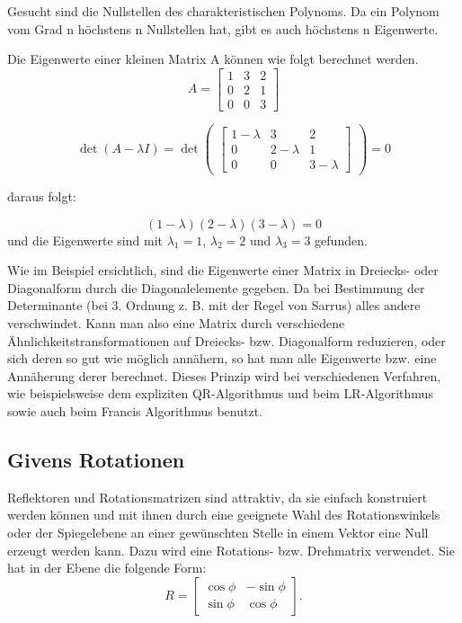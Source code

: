 Gesucht sind die Nullstellen des charakteristischen Polynoms. Da ein Polynom vom Grad n höchstens n Nullstellen hat, gibt es auch höchstens n Eigenwerte.

\begin{beispiel}
	Die Eigenwerte einer kleinen Matrix A können wie folgt berechnet werden.
	\begin{equation}
	A =
	\begin{bmatrix}
	1 & 3 & 2 \\
	0 & 2 & 1 \\
	0 & 0 & 3
	\end{bmatrix}
	\end{equation}
	
	\begin{equation}
	\det(A-\lambda I)= \det
	\begin{pmatrix}
	\begin{bmatrix}
	1-\lambda & 3 & 2 \\
	0 & 2-\lambda & 1 \\
	0 & 0 & 3-\lambda
	\end{bmatrix}
	\end{pmatrix}
	= 0
	\end{equation}
	
	daraus folgt:
	
	\begin{equation} (1-\lambda)(2-\lambda)(3-\lambda)=0\end{equation}
	und die Eigenwerte sind mit $\lambda_{1}=1$, $\lambda_{2}=2$ und $\lambda_{3}=3$ gefunden.
\end{beispiel}

Wie im Beispiel ersichtlich, sind die Eigenwerte einer Matrix in Dreiecks- oder Diagonalform durch die Diagonalelemente gegeben.
Da bei Bestimmung der Determinante (bei 3. Ordnung z. B. mit der Regel von Sarrus) alles andere verschwindet.
Kann man also eine Matrix durch verschiedene Ähnlichkeitstransformationen auf Dreiecks- bzw. Diagonalform reduzieren, oder sich deren so gut wie möglich annähern, so hat man alle Eigenwerte bzw. eine Annäherung derer berechnet.
Dieses Prinzip wird bei verschiedenen Verfahren, wie beispielsweise dem expliziten QR-Algorithmus und beim LR-Algorithmus sowie auch beim Francis Algorithmus benutzt.

\subsection{Givens Rotationen\label{francis:section:grundlagen:givens}}
Reflektoren und Rotationsmatrizen sind attraktiv, da sie einfach konstruiert werden können und mit ihnen durch eine geeignete Wahl des Rotationswinkels oder der Spiegelebene an einer gewünschten Stelle in einem Vektor eine Null erzeugt werden kann.
Dazu wird eine Rotations- bzw. Drehmatrix verwendet.
Sie hat in der Ebene die folgende Form:
\begin{equation}
	R=\begin{bmatrix}
	\cos\phi & -\sin\phi \\
	\sin\phi & \cos\phi
	\end{bmatrix}.
\end{equation}

